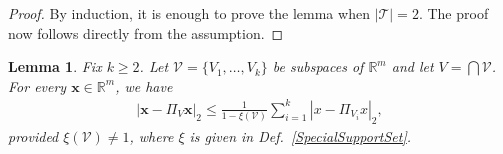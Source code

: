 \documentclass[journal, twocolumn]{IEEEtran}
\newtheorem{lemma}{Lemma}
\begin{document}
\begin{proof}By induction, it is enough to prove the lemma when $|\mathcal{T}| = 2$. The proof now follows directly from the assumption.
\end{proof}


\begin{lemma}\label{DistanceToIntersectionLemma}
Fix $k \geq 2$. Let $\mathcal{V} = \{V_1, \ldots, V_k\}$ be subspaces of $\mathbb{R}^m$ and let $V = \bigcap \mathcal{V}$. For every $\mathbf{x} \in \mathbb{R}^m$, we have
\begin{align}\label{DTILeq}
|\mathbf{x} - \Pi_V \mathbf{x}|_2 \leq \frac{1}{1 - \xi(\mathcal{V})} \sum_{i=1}^k |x - \Pi_{V_i} x|_2,
\end{align}
provided $\xi(\mathcal{V}) \neq 1$, where $\xi$ is given in Def.~\ref{SpecialSupportSet}.
\end{lemma}
\end{document}
